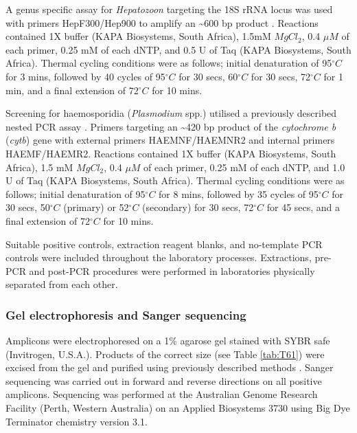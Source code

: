 \documentclass[a4paper, nobind]{templates/ociamthesis}
\begin{document}
A genus specific assay for \emph{Hepatozoon} targeting the 18S rRNA locus was used with primers HepF300/Hep900 to amplify an \textasciitilde600 bp product \autocite{ujvariHighPrevalenceHepatozoon2004}. Reactions contained 1X buffer (KAPA Biosystems, South Africa), 1.5mM \(MgCl_{2}\), 0.4 \(\mu M\) of each primer, 0.25 mM of each dNTP, and 0.5 U of Taq (KAPA Biosystems, South Africa). Thermal cycling conditions were as follows; initial denaturation of 95\(^\circ C\) for 3 mins, followed by 40 cycles of 95\(^\circ C\) for 30 secs, 60\(^\circ C\) for 30 secs, 72\(^\circ C\) for 1 min, and a final extension of 72\(^\circ C\) for 10 mins.

Screening for haemosporidia (\emph{Plasmodium} spp.) utilised a previously described nested PCR assay \autocite{waldenstromNewNestedPolymerase2004}. Primers targeting an \textasciitilde420 bp product of the \emph{cytochrome b} (\emph{cytb}) gene with external primers HAEMNF/HAEMNR2 and internal primers HAEMF/HAEMR2. Reactions contained 1X buffer (KAPA Biosystems, South Africa), 1.5 mM \(MgCl_{2}\), 0.4 \(\mu M\) of each primer, 0.25 mM of each dNTP, and 1.0 U of Taq (KAPA Biosystems, South Africa). Thermal cycling conditions were as follows; initial denaturation of 95\(^\circ C\) for 8 mins, followed by 35 cycles of 95\(^\circ C\) for 30 secs, 50\(^\circ C\) (primary) or 52\(^\circ C\) (secondary) for 30 secs, 72\(^\circ C\) for 45 secs, and a final extension of 72\(^\circ C\) for 10 mins.

Suitable positive controls, extraction reagent blanks, and no-template PCR controls were included throughout the laboratory processes. Extractions, pre-PCR and post-PCR procedures were performed in laboratories physically separated from each other.

\hypertarget{gel-electrophoresis-and-sanger-sequencing}{%
\subsubsection{Gel electrophoresis and Sanger sequencing}\label{gel-electrophoresis-and-sanger-sequencing}}

Amplicons were electrophoresed on a 1\% agarose gel stained with SYBR safe (Invitrogen, U.S.A.). Products of the correct size (see Table \ref{tab:T61}) were excised from the gel and purified using previously described methods \autocite{yangSpecificQuantitativeDetection2013}. Sanger sequencing was carried out in forward and reverse directions on all positive amplicons. Sequencing was performed at the Australian Genome Research Facility (Perth, Western Australia) on an Applied Biosystems 3730 using Big Dye Terminator chemistry version 3.1.
\end{document}
